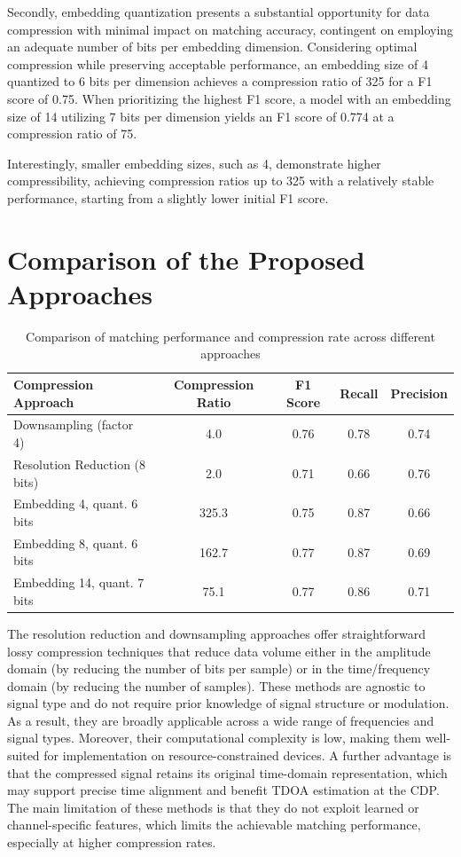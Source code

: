 \documentclass[sigconf, 10pt, nonacm, anonymous]{acmart}  %
\begin{document}
Secondly, embedding quantization presents a substantial opportunity for data compression with minimal impact on matching accuracy, contingent on employing an adequate number of bits per embedding dimension. Considering optimal compression while preserving acceptable performance, an embedding size of 4 quantized to 6 bits per dimension achieves a compression ratio of 325 for a F1 score of 0.75. When prioritizing the highest F1 score, a model with an embedding size of 14 utilizing 7 bits per dimension yields an F1 score of 0.774 at a compression ratio of 75.

Interestingly, smaller embedding sizes, such as 4, demonstrate higher compressibility, achieving compression ratios up to 325 with a relatively stable performance, starting from a slightly lower initial F1 score. 

\section{Comparison of the Proposed Approaches}

\begin{table}[t]
    \centering
    \caption{Comparison of matching performance and compression rate across different approaches}
    \label{tab:compression_comparison}
    \begin{tabular}{lcccc}
        \toprule
        \textbf{Compression Approach} & \textbf{Compression Ratio} & \textbf{F1 Score} & \textbf{Recall} & \textbf{Precision} \\
        \midrule
        Downsampling (factor 4) & 4.0 & 0.76 & 0.78 & 0.74 \\
        Resolution Reduction (8 bits) & 2.0 & 0.71 & 0.66 & 0.76 \\
        \addlinespace
        Embedding 4, quant. 6 bits & 325.3 & 0.75 & 0.87 & 0.66 \\
        Embedding 8, quant. 6 bits & 162.7 & 0.77 & 0.87 & 0.69 \\
        Embedding 14, quant. 7 bits & 75.1 & 0.77 & 0.86 & 0.71 \\
        \bottomrule
    \end{tabular}
\end{table}

The resolution reduction and downsampling approaches offer straightforward lossy compression techniques that reduce data volume either in the amplitude domain (by reducing the number of bits per sample) or in the time/frequency domain (by reducing the number of samples). These methods are agnostic to signal type and do not require prior knowledge of signal structure or modulation. As a result, they are broadly applicable across a wide range of frequencies and signal types. Moreover, their computational complexity is low, making them well-suited for implementation on resource-constrained devices. A further advantage is that the compressed signal retains its original time-domain representation, which may support precise time alignment and benefit TDOA estimation at the CDP. The main limitation of these methods is that they do not exploit learned or channel-specific features, which limits the achievable matching performance, especially at higher compression rates.
\end{document}
